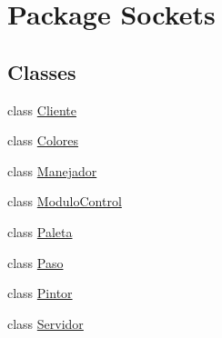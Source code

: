 \hypertarget{namespace_sockets}{}\section{Package Sockets}
\label{namespace_sockets}
\subsection*{Classes}
\begin{DoxyCompactItemize}
\item 
class \mbox{\hyperlink{class_sockets_1_1_cliente}{Cliente}}
\item 
class \mbox{\hyperlink{class_sockets_1_1_colores}{Colores}}
\item 
class \mbox{\hyperlink{class_sockets_1_1_manejador}{Manejador}}
\item 
class \mbox{\hyperlink{class_sockets_1_1_modulo_control}{Modulo\+Control}}
\item 
class \mbox{\hyperlink{class_sockets_1_1_paleta}{Paleta}}
\item 
class \mbox{\hyperlink{class_sockets_1_1_paso}{Paso}}
\item 
class \mbox{\hyperlink{class_sockets_1_1_pintor}{Pintor}}
\item 
class \mbox{\hyperlink{class_sockets_1_1_servidor}{Servidor}}
\end{DoxyCompactItemize}
